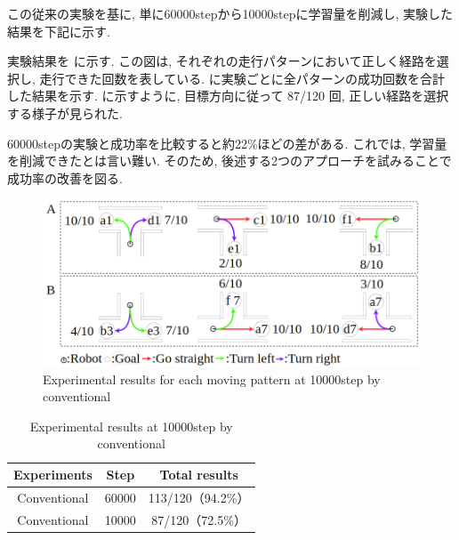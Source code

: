 \newpage

この従来の実験を基に, 単に60000stepから10000stepに学習量を削減し, 実験した結果を下記に示す.

実験結果を  に示す. この図は, それぞれの走行パターンにおいて正しく経路を選択し, 走行できた回数を表している.  に実験ごとに全パターンの成功回数を合計した結果を示す.  に示すように, 目標方向に従って 87/120 回, 正しい経路を選択する様子が見られた.

60000stepの実験と成功率を比較すると約22\%ほどの差がある. これでは, 学習量を削減できたとは言い難い. そのため, 後述する2つのアプローチを試みることで成功率の改善を図る.

\vspace{0.5cm}

\begin{figure}[hbtp]
  \centering
 \includegraphics[keepaspectratio, scale=0.43]
      {images/10000step.png}
 \caption{Experimental results for each moving pattern at 10000step by conventional}
 \label{Fig:10000step}
\end{figure}  

\vspace{0.5cm}

\begin{table}[hbtp]
  \caption{Experimental results at 10000step by conventional}
  \label{table:result_without}
  \centering
  \begin{tabular}{|c|c|c|}
    \hline
    Experiments & Step & Total results\\
    \hline
    Conventional & 60000 & 113/120（94.2\%）\\
    \hline
    Conventional & 10000 & 87/120（72.5\%）\\
    \hline
  \end{tabular}
\end{table}

\newpage




